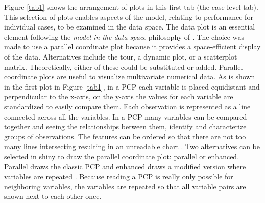 \documentclass[smallextended,natbib]{svjour3}\usepackage[]{graphicx}\usepackage[]{xcolor}
\begin{document}
Figure \ref{tab1} shows the arrangement of plots in this first tab (the case level tab). This selection of plots enables aspects of the model, relating to performance for individual cases, to be examined in the data space. The data plot is an essential element following the {\em model-in-the-data-space} philosophy of \citet{wickham2015visualizing}. The choice was made to use a parallel coordinate plot because it provides a space-efficient display of the data. Alternatives include the tour, a dynamic plot, or a scatterplot matrix. Theoretically, either of these could be substituted or added.
Parallel coordinate plots are useful to visualize multivariate numerical data. As is shown in the first plot in Figure \ref{tab1}, in a PCP each variable is placed equidistant and perpendicular to the x-axis, on the y-axis the values for each variable are standardized to easily compare them. Each observation is represented as a line connected across  all the variables. In a PCP many variables can be compared together and seeing the relationships between them, identify and characterize groups of observations. The features can be ordered so that there are not too many lines intersecting resulting in an unreadable chart \citep{inselberg2009parallel}.
Two alternatives can be selected in shiny to draw the parallel coordinate plot: parallel or enhanced. Parallel draws the classic PCP and enhanced draws a modified version where variables are repeated \citep{hurley2011eulerian}. Because reading a PCP is really only possible for neighboring variables, the variables are repeated so that all variable pairs are shown next to each other once.
\end{document}
